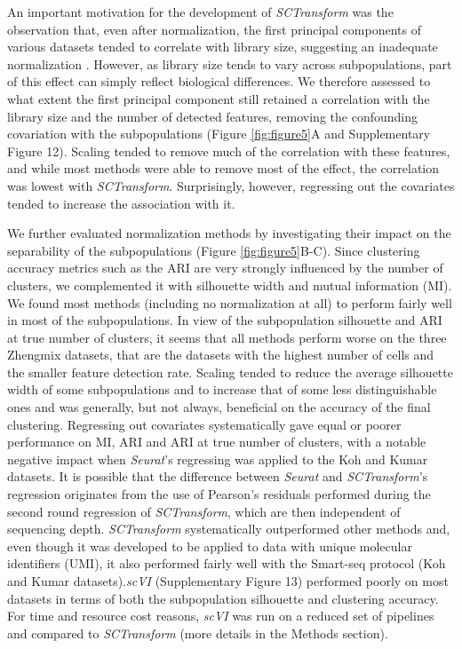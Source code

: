 \documentclass{bmcart}
\begin{document}
An important motivation for the development of \textit{SCTransform} was the observation that, even after normalization, the first principal components of various datasets tended to correlate with library size, suggesting an inadequate normalization \cite{hafemeisterSCtransform2019}. However, as library size tends to vary across subpopulations, part of this effect can simply reflect biological differences. We therefore assessed to what extent the first principal component still retained a correlation with the library size and the number of detected features, removing the confounding covariation with the subpopulations (Figure \ref{fig:figure5}A and Supplementary Figure 12). Scaling tended to remove much of the correlation with these features, and while most methods were able to remove most of the effect, the correlation was lowest with \textit{SCTransform}. Surprisingly, however, regressing out the covariates tended to increase the association with it.

We further evaluated normalization methods by investigating their impact on the separability of the subpopulations (Figure \ref{fig:figure5}B-C). Since clustering accuracy metrics such as the ARI are very strongly influenced by the number of clusters, we complemented it with silhouette width \cite{RousseeuwSil1987} and mutual information (MI). We found most methods (including no normalization at all) to perform fairly well in most of the subpopulations. In view of the subpopulation silhouette and ARI at true number of clusters, it seems that all methods perform worse on the three Zhengmix datasets, that are the datasets with the highest number of cells and the smaller feature detection rate. Scaling tended to reduce the average silhouette width of some subpopulations and to increase that of some less distinguishable ones and was generally, but not always, beneficial on the accuracy of the final clustering. Regressing out covariates systematically gave equal  or poorer performance on MI, ARI and ARI at true number of clusters, with a notable negative impact when \textit{Seurat}'s regressing was applied to the Koh and Kumar datasets. It is possible that the difference between \textit{Seurat} and \textit{SCTransform}'s regression originates from the use of Pearson's residuals performed during the second round regression of \textit{SCTransform}, which are then independent of sequencing depth. \textit{SCTransform} systematically outperformed other methods and, even though it was developed to be applied to data with unique molecular identifiers (UMI), it also performed fairly well with the Smart-seq protocol (Koh and Kumar datasets).\textit{scVI} (Supplementary Figure 13) performed poorly on most datasets in terms of both the subpopulation silhouette and clustering accuracy. For time and resource cost reasons, \textit{scVI} was run on a reduced set of pipelines and compared to \textit{SCTransform} (more details in the Methods section).
\end{document}
